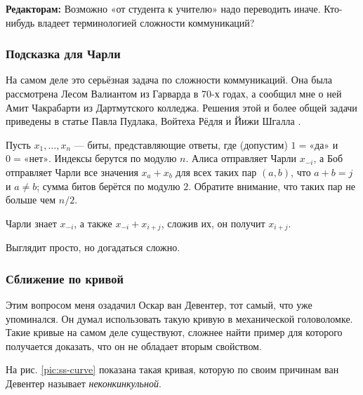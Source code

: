 \begin{addedbytheeditors}
 \textbf{Редакторам:} Возможно «от студента к учителю» надо переводить иначе.
Кто-нибудь владеет терминологией сложности коммуникаций?
 \end{addedbytheeditors}

\subsubsection*{Подсказка для Чарли}

На самом деле это серьёзная задача по сложности коммуникаций.
Она была рассмотрена Лесом Валиантом из Гарварда в 70-х годах,
а сообщил мне о ней Амит Чакрабарти из Дартмутского колледжа.
Решения этой и более общей задачи приведены в статье Павла Пудлака, Войтеха Рёдля и Йижи Шгалла \cite{49}.

Пусть $x_1, \dots , x_n$ --- биты, представляющие ответы, где (допустим) $1 = \text{«да»}$ и $0 = \text{«нет»}$.
Индексы берутся по модулю $n$.
Алиса отправляет Чарли $x_{-i}$,
а Боб отправляет Чарли все значения $x_a + x_b$ для всех таких пар $(a, b)$, что $a + b = j$ и $a\ne b$;
сумма битов берётся по модулю $2$.
Обратите внимание, что таких пар не больше чем $n/2$.

Чарли знает $x_{-i}$, а также $x_{-i} + x_{i+j}$, сложив их, он получит $x_{i+j}$.

Выглядит просто, но догадаться сложно.


\subsubsection*{Сближение по кривой}

Этим вопросом меня озадачил Оскар ван Девентер, тот самый, что уже упоминался.
Он думал использовать такую кривую в механической головоломке.
Такие кривые на самом деле существуют, сложнее найти пример для которого получается доказать, что он не обладает вторым свойством.

На рис. \ref{pic:ss-curve} показана такая кривая, которую по своим причинам ван Девентер называет \emph{неконкинкульной}.

